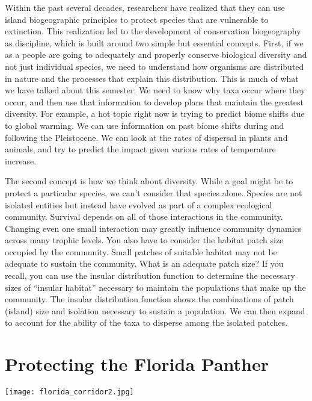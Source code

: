 \documentclass[letterpaper]{tufte-handout}
\begin{document}
Within the past several decades, researchers have realized that they can use island biogeographic principles to protect species that are vulnerable to extinction. This realization led to the development of conservation biogeography as discipline, which is built around two simple but essential concepts.  First, if we as a people are going to adequately and properly conserve biological diversity and not just individual species, we need to understand how organisms are distributed in nature and the processes that explain this distribution. This is much of what we have talked about this semester.  We need to know why taxa occur where they occur, and then use that information to develop plans that maintain the greatest diversity. For example, a hot topic right now is trying to predict biome shifts due to global warming.  We can use information on past biome shifts during and following the Pleistocene.  We can look at the rates of dispersal in plants and animals, and try to predict the impact given various rates of temperature increase.

The second concept is how we think about diversity. While a goal might be to protect a particular species, we can't consider that species alone.  Species are not isolated entities but instead have evolved as part of a complex ecological community.  Survival depends on all of those interactions in the community.  Changing even one small interaction may greatly influence community dynamics across many trophic levels. You also have to consider the habitat patch size occupied by the community.  Small patches of suitable habitat may not be adequate to sustain the community.  What is an adequate patch size?  If you recall, you can use the insular distribution function to determine the necessary sizes of ``insular habitat'' necessary to maintain the populations that make up the community. The insular distribution function shows the combinations of patch (island) size and isolation necessary to sustain a population.  We can then expand to account for the ability of the taxa to disperse among the isolated patches.

\section{Protecting the Florida Panther}
\begin{marginfigure}%
	\texttt{[image: florida\_corridor2.jpg]}
\end{marginfigure} 
\end{document}
